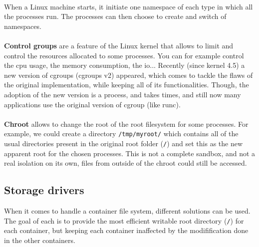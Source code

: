 \paragraph{}When a Linux machine starts, it initiate one namespace of each type in which all the processes run.  The processes can then choose to create and switch of namespaces.

\paragraph{}\textbf{Control groups} are a feature of the Linux kernel that allows to limit and control the resources allocated to some processes.  You can for example control the cpu usage, the memory consumption, the io...  Recently (since kernel 4.5) a new version of cgroups (cgroups v2) appeared, which comes to tackle the flaws of the original implementation, while keeping all of its functionalities.  Though, the adoption of the new version is a process, and takes times, and still now many applications use the original version of cgroup (like runc).

\paragraph{}\textbf{Chroot} allows to change the root of the root filesystem for some processes.  For example, we could create a directory \texttt{/tmp/myroot/} which contains all of the usual directories present in the original root folder (\texttt{/}) and set this as the new apparent root for the chosen processes.  This is not a complete sandbox, and not a real isolation on its own, files from outside of the chroot could still be accessed.

\subsection{Storage drivers}
When it comes to handle a container file system, different solutions can be used.  The goal of each is to provide the most efficient writable root directory (\texttt{/}) for each container, but keeping each container inaffected by the modifification done in the other containers.

